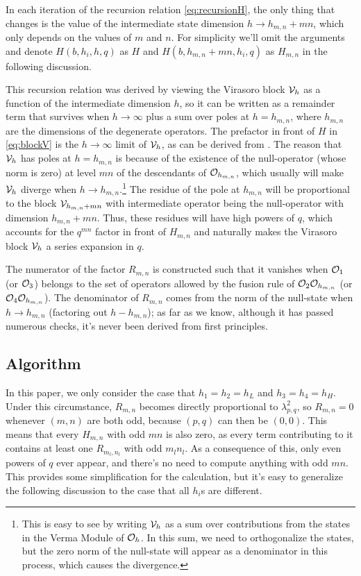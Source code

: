 \documentclass[12pt]{article}
\numberwithin{equation}{section}
\newcommand{\CO}{{\cal O}}
\newcommand{\CV}{{\cal V}}
\begin{document}
In each iteration of the recursion relation \ref{eq:recursionH}, the only thing that changes is the value of the intermediate state dimension $h\rightarrow h_{m,n}+mn$, which only depends on the values of $m$ and $n$. For simplicity we'll omit the arguments and denote $H(b,h_i,h,q)$ as $H$ and $H(b,h_{m,n}+mn,h_i,q)$ as $H_{m,n}$ in the following discussion.

This recursion relation was derived by viewing the Virasoro block $\CV_h$ as a function of the intermediate dimension $h$, so it can be written as a remainder term that survives when $h\rightarrow \infty$ plus a sum over poles at $h=h_{m,n}$, where $h_{m,n}$ are the dimensions of the degenerate operators. The prefactor in front of $H$ in \ref{eq:blockV} is the $h\rightarrow \infty$ limit of $\CV_h$, as can be derived from \cite{ZamolodchikovRecursion, Zamolodchikovq, Zamolodchikov:1986gh}. The reason that $\CV_h$ has poles at $h=h_{m,n}$ is because of the existence of the null-operator (whose norm is zero) at level $mn$ of the descendants of $\CO_{h_{m,n}}$, which usually will make $\CV_h$ diverge when $h\rightarrow h_{m,n}$.\footnote{This is easy to see by writing $\CV_h$ as a sum over contributions from the states in the Verma Module of $\CO_h$. In this sum, we need to orthogonalize the states, but the zero norm of the null-state will appear as a denominator in this process, which causes the divergence.} The residue of the pole at $h_{m,n}$ will be proportional to the block $\CV_{h_{m,n}+mn}$ with  intermediate operator being the null-operator with dimension $h_{m,n}+mn$. Thus, these residues will have high powers of $q$, which accounts for the $q^{mn}$ factor in front of $H_{m,n}$ and naturally makes the Virasoro block $\CV_h$ a series expansion in $q$.  
   
The numerator of the factor $R_{m,n}$ is constructed such that it vanishes when $\CO_{1}$ (or $\CO_{3}$) belongs to the set of operators allowed by the fusion rule of $\CO_2\CO_{h_{m,n}}$ (or $\CO_4\CO_{h_{m,n}}$). The denominator of $R_{m,n}$ comes from the norm of the null-state when $h\rightarrow h_{m,n}$ (factoring out $h-h_{m,n}$); as far as we know, although it has passed numerous checks, it's never been derived from first principles. 
 
\subsection{Algorithm}
In this paper, we only consider the case that $h_1 = h_2 =h_L$ and $h_3 = h_4 = h_H$. Under this circumstance, $R_{m,n}$ becomes directly proportional to $\lambda_{p,q}^2$, so $R_{m,n} = 0$ whenever $(m,n)$ are both odd, because $(p,q)$ can then be $(0,0)$. This means that every $H_{m,n}$ with odd $mn$ is also zero, as every term contributing to it contains at least one $R_{m_l,n_l}$ with odd $m_ln_l$. As a consequence of this, only even powers of $q$ ever appear, and there's no need to compute anything with odd $mn$. This provides some simplification for the calculation, but it's easy to generalize the following discussion to the case that all $h_i$s are different.
\end{document}
